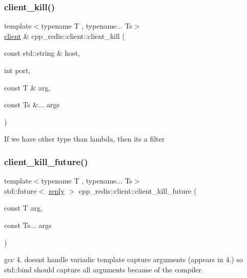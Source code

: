\subsubsection{\texorpdfstring{client\+\_\+kill()}{client\_kill()}}
{\footnotesize\ttfamily template$<$typename T , typename... Ts$>$ \\
\hyperlink{classcpp__redis_1_1client}{client} \& cpp\+\_\+redis\+::client\+::client\+\_\+kill (\begin{DoxyParamCaption}\item[{const std\+::string \&}]{host,  }\item[{int}]{port,  }\item[{const T \&}]{arg,  }\item[{const Ts \&...}]{args }\end{DoxyParamCaption})\hspace{0.3cm}{\ttfamily [inline]}}

If we have other type than lambda, then it\textquotesingle{}s a filter \mbox{\label{classcpp__redis_1_1client_ae6f09b6c022c910b79fb90a47291f511}} 
\subsubsection{\texorpdfstring{client\+\_\+kill\+\_\+future()}{client\_kill\_future()}}
{\footnotesize\ttfamily template$<$typename T , typename... Ts$>$ \\
std\+::future$<$ \hyperlink{classcpp__redis_1_1reply}{reply} $>$ cpp\+\_\+redis\+::client\+::client\+\_\+kill\+\_\+future (\begin{DoxyParamCaption}\item[{const T}]{arg,  }\item[{const Ts...}]{args }\end{DoxyParamCaption})}

gcc 4. doesn\textquotesingle{}t handle variadic template capture arguments (appears in 4.) so std\+::bind should capture all arguments because of the compiler. \mbox{\label{classcpp__redis_1_1client_a36a48d61a4900e88fd67795ca59cbea3}} 
